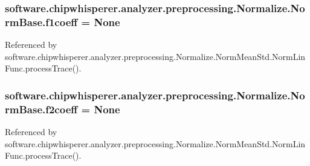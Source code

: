 \subsubsection[{f1coeff}]{\setlength{\rightskip}{0pt plus 5cm}software.\+chipwhisperer.\+analyzer.\+preprocessing.\+Normalize.\+Norm\+Base.\+f1coeff = None\hspace{0.3cm}{\ttfamily [static]}}\label{classsoftware_1_1chipwhisperer_1_1analyzer_1_1preprocessing_1_1Normalize_1_1NormBase_ad2870d88ba58ea7c960785f6d06dc347}


Referenced by software.\+chipwhisperer.\+analyzer.\+preprocessing.\+Normalize.\+Norm\+Mean\+Std.\+Norm\+Lin\+Func.\+process\+Trace().

\hypertarget{classsoftware_1_1chipwhisperer_1_1analyzer_1_1preprocessing_1_1Normalize_1_1NormBase_a0aa99eac0acf2e3225a3be102c2cc8c4}{}
\subsubsection[{f2coeff}]{\setlength{\rightskip}{0pt plus 5cm}software.\+chipwhisperer.\+analyzer.\+preprocessing.\+Normalize.\+Norm\+Base.\+f2coeff = None\hspace{0.3cm}{\ttfamily [static]}}\label{classsoftware_1_1chipwhisperer_1_1analyzer_1_1preprocessing_1_1Normalize_1_1NormBase_a0aa99eac0acf2e3225a3be102c2cc8c4}


Referenced by software.\+chipwhisperer.\+analyzer.\+preprocessing.\+Normalize.\+Norm\+Mean\+Std.\+Norm\+Lin\+Func.\+process\+Trace().

\hypertarget{classsoftware_1_1chipwhisperer_1_1analyzer_1_1preprocessing_1_1Normalize_1_1NormBase_af9b608d0084373ff2e31838ffd0e3940}{}
